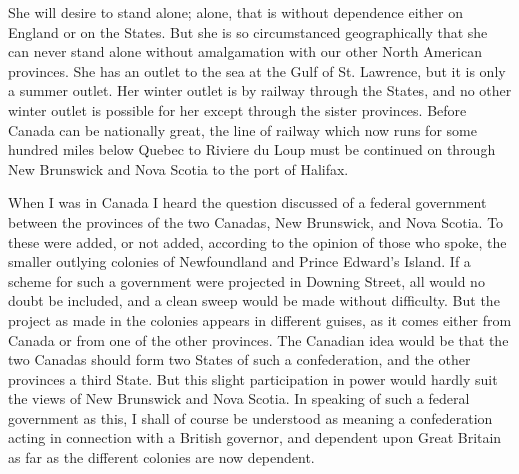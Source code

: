 She will desire to stand alone; alone, that is without dependence
either on England or on the States.  But she is so circumstanced
geographically that she can never stand alone without amalgamation
with our other North American provinces.  She has an outlet to the
sea at the Gulf of St. Lawrence, but it is only a summer outlet.
Her winter outlet is by railway through the States, and no other
winter outlet is possible for her except through the sister
provinces.  Before Canada can be nationally great, the line of
railway which now runs for some hundred miles below Quebec to
Riviere du Loup must be continued on through New Brunswick and Nova
Scotia to the port of Halifax.

When I was in Canada I heard the question discussed of a federal
government between the provinces of the two Canadas, New Brunswick,
and Nova Scotia.  To these were added, or not added, according to
the opinion of those who spoke, the smaller outlying colonies of
Newfoundland and Prince Edward's Island.  If a scheme for such a
government were projected in Downing Street, all would no doubt be
included, and a clean sweep would be made without difficulty.  But
the project as made in the colonies appears in different guises, as
it comes either from Canada or from one of the other provinces.
The Canadian idea would be that the two Canadas should form two
States of such a confederation, and the other provinces a third
State.  But this slight participation in power would hardly suit
the views of New Brunswick and Nova Scotia.  In speaking of such a
federal government as this, I shall of course be understood as
meaning a confederation acting in connection with a British
governor, and dependent upon Great Britain as far as the different
colonies are now dependent.

